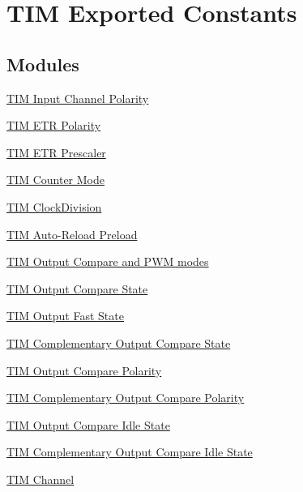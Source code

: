 \hypertarget{group___t_i_m___exported___constants}{}\section{T\+IM Exported Constants}
\label{group___t_i_m___exported___constants}
\subsection*{Modules}
\begin{DoxyCompactItemize}
\item 
\hyperlink{group___t_i_m___input___channel___polarity}{T\+I\+M Input Channel Polarity}
\item 
\hyperlink{group___t_i_m___e_t_r___polarity}{T\+I\+M E\+T\+R Polarity}
\item 
\hyperlink{group___t_i_m___e_t_r___prescaler}{T\+I\+M E\+T\+R Prescaler}
\item 
\hyperlink{group___t_i_m___counter___mode}{T\+I\+M Counter Mode}
\item 
\hyperlink{group___t_i_m___clock_division}{T\+I\+M Clock\+Division}
\item 
\hyperlink{group___t_i_m___auto_reload_preload}{T\+I\+M Auto-\/\+Reload Preload}
\item 
\hyperlink{group___t_i_m___output___compare__and___p_w_m__modes}{T\+I\+M Output Compare and P\+W\+M modes}
\item 
\hyperlink{group___t_i_m___output___compare___state}{T\+I\+M Output Compare State}
\item 
\hyperlink{group___t_i_m___output___fast___state}{T\+I\+M Output Fast State}
\item 
\hyperlink{group___t_i_m___output___compare___n___state}{T\+I\+M Complementary Output Compare State}
\item 
\hyperlink{group___t_i_m___output___compare___polarity}{T\+I\+M Output Compare Polarity}
\item 
\hyperlink{group___t_i_m___output___compare___n___polarity}{T\+I\+M Complementary Output Compare Polarity}
\item 
\hyperlink{group___t_i_m___output___compare___idle___state}{T\+I\+M Output Compare Idle State}
\item 
\hyperlink{group___t_i_m___output___compare___n___idle___state}{T\+I\+M Complementary Output Compare Idle State}
\item 
\hyperlink{group___t_i_m___channel}{T\+I\+M Channel}
\item 

\end{DoxyCompactItemize}
